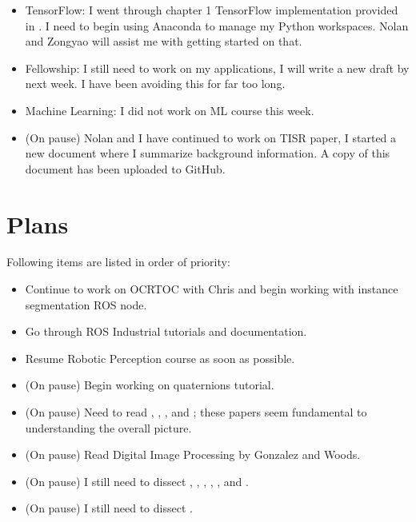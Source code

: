\documentclass[11pt]{article}
\begin{document}
\begin{itemize}
	\item TensorFlow: I went through chapter 1 TensorFlow implementation provided in \cite{HandsOn_CV_w_tf2}. I need to begin using Anaconda to manage my Python workspaces. Nolan and Zongyao will assist me with getting started on that.

	\item Fellowship: I still need to work on my applications, I will write a new draft by next week. I have been avoiding this for far too long.

	\item Machine Learning: I did not work on ML course this week.

	\item (On pause) Nolan and I have continued to work on TISR paper, I started a new document where I summarize background information. A copy of this document has been uploaded to GitHub.


\end{itemize}

\newpage

\section{Plans}
Following items are listed in order of priority:

\begin{itemize}
	\item Continue to work on OCRTOC with Chris and begin working with instance segmentation ROS node.

	\item Go through ROS Industrial tutorials and documentation.

	\item Resume Robotic Perception course as soon as possible.

	\item (On pause) Begin working on quaternions tutorial.

	\item (On pause) Need to read \cite{ImSRwDeepCNN}, \cite{MixDNNforSISR}, \cite{mModalSemanticSLAMwProb}, and \cite{RCANforImClass}; these papers seem fundamental to understanding the overall picture.

	\item (On pause) Read Digital Image Processing by Gonzalez and Woods.

	\item (On pause) I still need to dissect \cite{PanopticSeg2019}, \cite{SVO}, \cite{HornsMethod}, \cite{NYUV2}, \cite{DGCNNLPC}, and \cite{MaskRCNN}.

	\item (On pause) I still need to dissect \cite{ZinsserWilliamKnowlton2006Oww}.
\end{itemize}



\newpage


\end{document}
